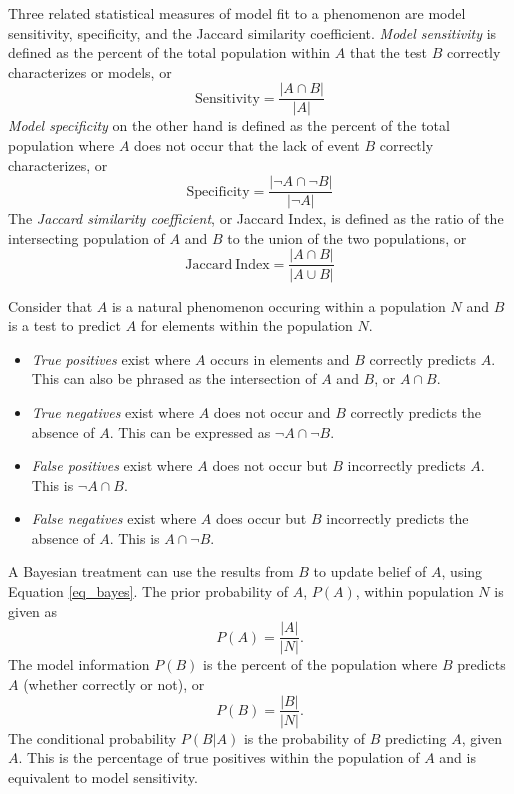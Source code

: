 \documentclass[12pt,letter]{article}
\begin{document}
		Three related statistical measures of model fit to a phenomenon are model sensitivity, specificity, and the Jaccard similarity coefficient. \textit{Model sensitivity} is defined as the percent of the total population within $A$ that the test $B$ correctly characterizes or models, or
		\begin{equation}
		\mathrm{Sensitivity} = \frac{|A\cap B|}{|A|}\label{eq_sensitivity}
		\end{equation}
		\textit{Model specificity} on the other hand is defined as the percent of the total population where $A$ does not occur that the lack of event $B$ correctly characterizes, or 
		\begin{equation}
		\mathrm{Specificity} = \frac{|\neg A\cap \neg B|}{|\neg A|}
		\end{equation}
		The \textit{Jaccard similarity coefficient}, or Jaccard Index, is defined as the ratio of the intersecting population of $A$ and $B$ to the union of the two populations, or
		\begin{equation}
		\mathrm{Jaccard~Index} = \frac{|A\cap B|}{|A\cup B|}
		\end{equation}

		Consider that $A$ is a natural phenomenon occuring within a population $N$ and $B$ is a test to predict $A$ for elements within the population $N$. 
		\begin{itemize}
		\item \textit{True positives} exist where $A$ occurs in elements and $B$ correctly predicts $A$. This can also be phrased as the intersection of $A$ and $B$, or $A\cap B$.
		\item \textit{True negatives} exist where $A$ does not occur and $B$ correctly predicts the absence of $A$. This can be expressed as $\neg A\cap\neg B$.
		\item \textit{False positives} exist where $A$ does not occur but $B$ incorrectly predicts $A$. This is $\neg A\cap B$.
		\item \textit{False negatives} exist where $A$ does occur but $B$ incorrectly predicts the absence of $A$. This is $A\cap\neg B$.
		\end{itemize}

		A Bayesian treatment can use the results from $B$ to update belief of $A$, using Equation \ref{eq_bayes}. The prior probability of $A$, $P(A)$, within population $N$ is given as
		\begin{equation}
		P(A)=\frac{|A|}{|N|}.\label{eq_PA}
		\end{equation}
		The model information $P(B)$ is the percent of the population where $B$ predicts $A$ (whether correctly or not), or 
		\begin{equation}
		P(B)=\frac{|B|}{|N|}.\label{eq_PB}
		\end{equation}
		The conditional probability $P(B|A)$ is the probability of $B$ predicting $A$, given $A$. This is the percentage of true positives within the population of $A$ and is equivalent to model sensitivity.
\end{document}
